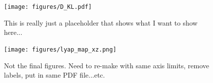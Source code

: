 \documentclass[letterpaper,12pt,preprint]{aastex}
\begin{document}
\begin{figure}[p]
\begin{center}
\texttt{[image: figures/D\_KL.pdf]}
\caption{This is really just a placeholder that shows what I want to show here...} \label{fig:DKL}
\end{center}
\end{figure}

\begin{figure}[p]
\centering
	\texttt{[image: figures/lyap\_map\_xz.png]}
	\caption{Not the final figures. Need to re-make with same axis limits, remove labels, put in same PDF file...etc.} 
	\label{fig:lyapmap}
\end{figure}

\end{document}
